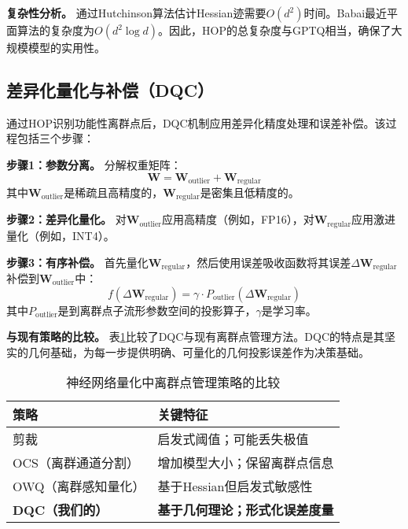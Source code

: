 \documentclass[letterpaper,twocolumn,10pt]{article}
\begin{document}
\textbf{复杂性分析。} 通过Hutchinson算法估计Hessian迹需要$O(d^2)$时间。Babai最近平面算法的复杂度为$O(d^2 \log d)$。因此，HOP的总复杂度与GPTQ相当，确保了大规模模型的实用性。

\subsection{差异化量化与补偿（DQC）}

通过HOP识别功能性离群点后，DQC机制应用差异化精度处理和误差补偿。该过程包括三个步骤：

\textbf{步骤1：参数分离。} 分解权重矩阵：
\begin{equation}
\mathbf{W} = \mathbf{W}_{\text{outlier}} + \mathbf{W}_{\text{regular}}
\end{equation}
其中$\mathbf{W}_{\text{outlier}}$是稀疏且高精度的，$\mathbf{W}_{\text{regular}}$是密集且低精度的。

\textbf{步骤2：差异化量化。} 对$\mathbf{W}_{\text{outlier}}$应用高精度（例如，FP16），对$\mathbf{W}_{\text{regular}}$应用激进量化（例如，INT4）。

\textbf{步骤3：有序补偿。} 首先量化$\mathbf{W}_{\text{regular}}$，然后使用误差吸收函数将其误差$\Delta \mathbf{W}_{\text{regular}}$补偿到$\mathbf{W}_{\text{outlier}}$中：
\begin{equation}
f(\Delta \mathbf{W}_{\text{regular}}) = \gamma \cdot P_{\text{outlier}}(\Delta \mathbf{W}_{\text{regular}})
\label{eq:compensation}
\end{equation}
其中$P_{\text{outlier}}$是到离群点子流形参数空间的投影算子，$\gamma$是学习率。

\textbf{与现有策略的比较。} 表\ref{tab:outlier_strategies}比较了DQC与现有离群点管理方法。DQC的特点是其坚实的几何基础，为每一步提供明确、可量化的几何投影误差作为决策基础。

\begin{table}[t]
\centering
\caption{神经网络量化中离群点管理策略的比较}
\label{tab:outlier_strategies}
\small
\begin{tabular}{ll}
\toprule
策略 & 关键特征 \\
\midrule
剪裁 & 启发式阈值；可能丢失极值 \\
OCS（离群通道分割） & 增加模型大小；保留离群点信息 \\
OWQ（离群感知量化） & 基于Hessian但启发式敏感性 \\
\textbf{DQC（我们的）} & \textbf{基于几何理论；形式化误差度量} \\
\bottomrule
\end{tabular}
\end{table}
\end{document}

